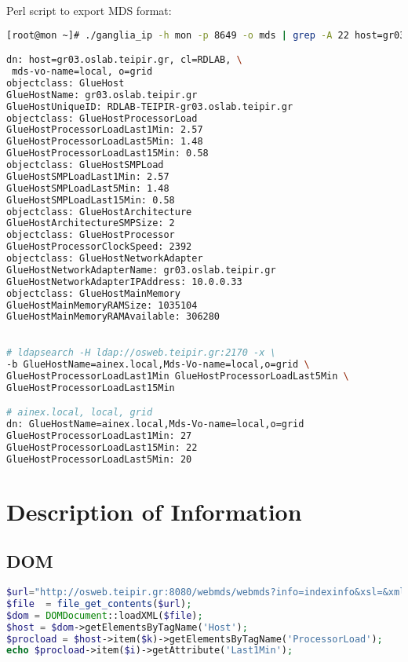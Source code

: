 Perl script to export MDS format:
\begin{lstlisting}[language=bash,caption=Perl Ganglia Information Provider for MDS]
[root@mon ~]# ./ganglia_ip -h mon -p 8649 -o mds | grep -A 22 host=gr03

dn: host=gr03.oslab.teipir.gr, cl=RDLAB, \
 mds-vo-name=local, o=grid
objectclass: GlueHost
GlueHostName: gr03.oslab.teipir.gr
GlueHostUniqueID: RDLAB-TEIPIR-gr03.oslab.teipir.gr
objectclass: GlueHostProcessorLoad
GlueHostProcessorLoadLast1Min: 2.57
GlueHostProcessorLoadLast5Min: 1.48
GlueHostProcessorLoadLast15Min: 0.58
objectclass: GlueHostSMPLoad
GlueHostSMPLoadLast1Min: 2.57
GlueHostSMPLoadLast5Min: 1.48
GlueHostSMPLoadLast15Min: 0.58
objectclass: GlueHostArchitecture
GlueHostArchitectureSMPSize: 2
objectclass: GlueHostProcessor
GlueHostProcessorClockSpeed: 2392
objectclass: GlueHostNetworkAdapter
GlueHostNetworkAdapterName: gr03.oslab.teipir.gr
GlueHostNetworkAdapterIPAddress: 10.0.0.33
objectclass: GlueHostMainMemory
GlueHostMainMemoryRAMSize: 1035104
GlueHostMainMemoryRAMAvailable: 306280
\end{lstlisting}

\begin{lstlisting}[language=bash,caption=BDII LDAP search for Glue CE ProcessorLoad attributes]

# ldapsearch -H ldap://osweb.teipir.gr:2170 -x \
-b GlueHostName=ainex.local,Mds-Vo-name=local,o=grid \
GlueHostProcessorLoadLast1Min GlueHostProcessorLoadLast5Min \
GlueHostProcessorLoadLast15Min

# ainex.local, local, grid
dn: GlueHostName=ainex.local,Mds-Vo-name=local,o=grid
GlueHostProcessorLoadLast1Min: 27
GlueHostProcessorLoadLast15Min: 22
GlueHostProcessorLoadLast5Min: 20

\end{lstlisting}

\section{Description of Information}

\subsection{DOM}

\begin{lstlisting}[language=PHP,caption=PHP DOM call to WebMDS]
$url="http://osweb.teipir.gr:8080/webmds/webmds?info=indexinfo&xsl=&xmlSource.indexinfo.param.xpathQuery=%2F%2F*[local-name%28%29%3D%27Host%27]";
$file  = file_get_contents($url);
$dom = DOMDocument::loadXML($file);
$host = $dom->getElementsByTagName('Host');
$procload = $host->item($k)->getElementsByTagName('ProcessorLoad');
echo $procload->item($i)->getAttribute('Last1Min');
\end{lstlisting}

